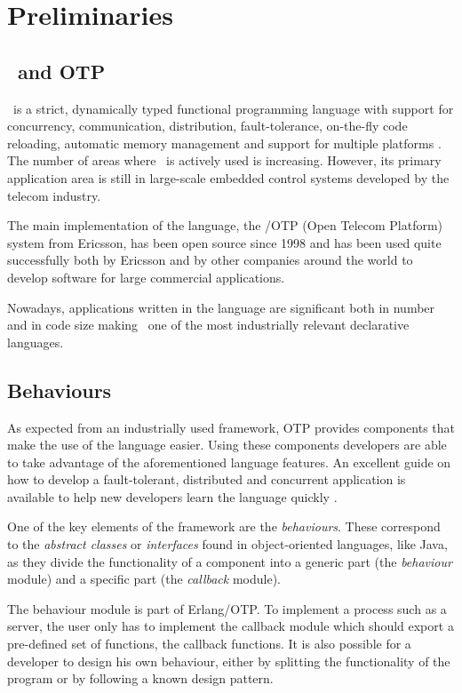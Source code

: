 \chapter{Preliminaries}

\section{\er\ and OTP}
\label{sct:erlang_preliminaries}

\er\ is a strict, dynamically typed functional programming language
with support for concurrency, communication, distribution,
fault-tolerance, on-the-fly code reloading, automatic memory
management and support for multiple platforms \cite{joe_book1}. The
number of areas where \er\ is actively used is increasing. However,
its primary application area is still in large-scale embedded control
systems developed by the telecom industry.

The main implementation of the language, the \er/OTP (Open Telecom
Platform) system from Ericsson, has been open source since 1998 and
has been used quite successfully both by Ericsson and by other
companies around the world to develop software for large commercial
applications.

Nowadays, applications written in the language are significant both in
number and in code size making \er\ one of the most industrially
relevant declarative languages.

\section{Behaviours}
\label{sct:behaviour_preliminaries}

As expected from an industrially used framework, OTP provides
components that make the use of the language easier. Using these
components developers are able to take advantage of the aforementioned
language features. An excellent guide on how to develop a
fault-tolerant, distributed and concurrent application is available to
help new developers learn the language quickly \cite{des_princ}.

One of the key elements of the framework are the
\emph{behaviours}. These correspond to the \emph{abstract classes} or
\emph{interfaces} found in object-oriented languages, like Java, as
they divide the functionality of a component into a generic part (the
\emph{behaviour} module) and a specific part (the \emph{callback}
module).

The behaviour module is part of Erlang/OTP. To implement a process
such as a server, the user only has to implement the callback module
which should export a pre-defined set of functions, the callback
functions. It is also possible for a developer to design his own
behaviour, either by splitting the functionality of the program or by
following a known design pattern\cite{behaviours}.

